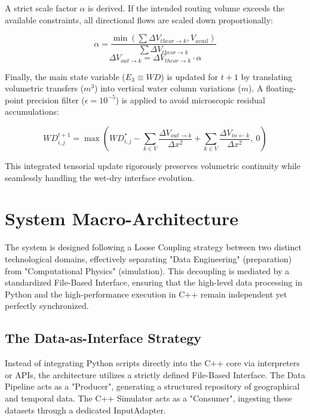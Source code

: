 A strict scale factor $\alpha$ is derived. If the intended routing volume exceeds the available constraints, all directional flows 
are scaled down proportionally:

$$\alpha = \frac{\min\left(\sum \Delta V_{theor \rightarrow k}, V_{avail}\right)}{\sum \Delta V_{theor \rightarrow k}}$$
$$\Delta V_{out \rightarrow k} = \Delta V_{theor \rightarrow k} \cdot \alpha$$

Finally, the main state variable ($E_3 \equiv WD$) is updated for $t+1$ by translating volumetric transfers ($m^3$) into vertical 
water column variations ($m$). A floating-point precision filter ($\epsilon = 10^{-5}$) is applied to avoid microscopic residual 
accumulations:

$$WD_{i,j}^{t+1} = \max\left(WD_{i,j}^* - \sum_{k \in V} \frac{\Delta V_{out \rightarrow k}}{\Delta x^2} + \sum_{k \in V} \frac{\Delta V_{in \leftarrow k}}{\Delta x^2}, \ 0\right)$$

This integrated tensorial update rigorously preserves volumetric continuity while seamlessly handling the wet-dry interface evolution.











\section{System Macro-Architecture}

The system is designed following a Loose Coupling strategy between two distinct technological domains, effectively 
separating "Data Engineering" (preparation) from "Computational Physics" (simulation). This decoupling is mediated 
by a standardized File-Based Interface, ensuring that the high-level data processing in Python and the high-performance 
execution in C++ remain independent yet perfectly synchronized.

\subsection{The Data-as-Interface Strategy}

Instead of integrating Python scripts directly into the C++ core via interpreters or APIs, the architecture utilizes 
a strictly defined File-Based Interface. The Data Pipeline acts as a "Producer", generating a structured repository 
of geographical and temporal data. The C++ Simulator acts as a "Consumer", ingesting these datasets through a dedicated 
InputAdapter.

